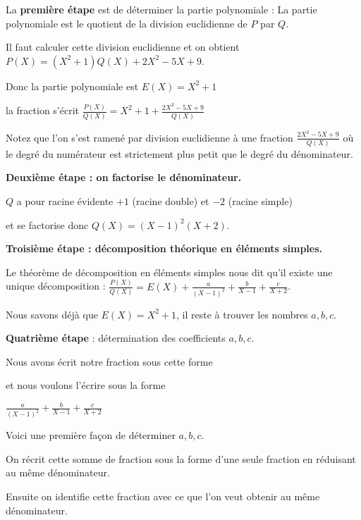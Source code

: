 La \textbf{première étape} est de déterminer la partie polynomiale : 
La partie polynomiale est le quotient de la division euclidienne de $P$ par $Q$.


\change

Il faut calculer cette division euclidienne et on obtient $P(X) = (X^2+1)Q(X)+ 2X^2-5X+9$.

\change

Donc la partie polynomiale est $E(X)=X^2+1$

\change

la fraction s'écrit
$\frac{P(X)}{Q(X)} =X^2+1 + \frac{2X^2-5X+9}{Q(X)}$

Notez que l'on s'est ramené par division euclidienne à une fraction $\frac{2X^2-5X+9}{Q(X)}$ où 
le degré du numérateur est strictement plus petit que le degré du dénominateur.

\change

\textbf{Deuxième étape : on factorise le dénominateur.}



$Q$ a pour racine évidente $+1$ (racine double) et $-2$ (racine simple) 

\change

et se factorise donc $Q(X)= (X-1)^2(X+2)$.

\change

\textbf{Troisième étape : décomposition théorique en éléments simples.}

\change

Le théorème de décomposition en éléments simples nous dit qu'il existe une unique décomposition :
$\frac{P(X)}{Q(X)}= E(X)+ \frac{a}{(X-1)^2} + \frac{b}{X-1} + \frac{c}{X+2}$.

Nous savons déjà que $E(X)=X^2+1$, il reste à trouver les nombres $a,b,c$.


\diapo

\textbf{Quatrième étape} : détermination des coefficients $a,b,c$.


Nous avons écrit notre fraction sous cette forme

et nous voulons l'écrire sous la forme  

$\frac{a}{(X-1)^2} + \frac{b}{X-1} + \frac{c}{X+2}$


Voici une première façon de déterminer $a,b,c$.

\change
On récrit cette somme de fraction sous la forme d'une seule fraction en réduisant au même dénominateur.

Ensuite on identifie cette fraction avec ce que l'on veut obtenir
au même dénominateur.

